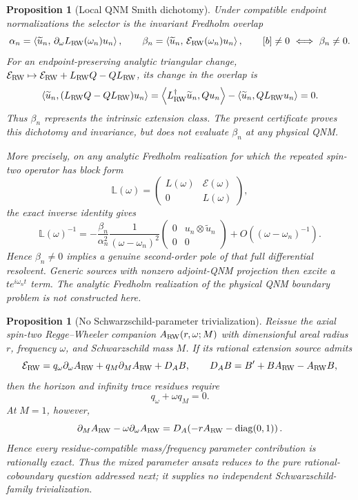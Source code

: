 \documentclass[11pt]{article}
\newtheorem{proposition}[theorem]{Proposition}
\theoremstyle{definition}
\theoremstyle{remark}
\begin{document}
\begin{proposition}[Local QNM Smith dichotomy]
Under compatible endpoint normalizations the selector is the invariant
Fredholm overlap
\[
 \alpha_n=\left\langle\widetilde u_n,\,
 \partial_\omega L_{\rm RW}(\omega_n)u_n\right\rangle,\qquad
 \beta_n=
 \left\langle\widetilde u_n,\,
 \mathcal E_{\rm RW}(\omega_n)u_n\right\rangle,
 \qquad
 [b]\ne0\ \Longleftrightarrow\ \beta_n\ne0 .
\]
For an endpoint-preserving analytic triangular change,
\(\mathcal E_{\rm RW}\mapsto
\mathcal E_{\rm RW}+L_{\rm RW}Q-QL_{\rm RW}\), its change in the overlap is
\[
 \left\langle\widetilde u_n,(L_{\rm RW}Q-QL_{\rm RW})u_n\right\rangle
 =
 \left\langle L_{\rm RW}^\dagger\widetilde u_n,Qu_n\right\rangle
 -\left\langle\widetilde u_n,QL_{\rm RW}u_n\right\rangle=0.
\]
Thus \(\beta_n\) represents the intrinsic extension class.  The present
certificate proves this dichotomy and invariance, but does not evaluate
\(\beta_n\) at any physical QNM.

More precisely, on any analytic Fredholm realization for which the repeated
spin-two operator has block form
\[
 \mathbb L(\omega)=
 \begin{pmatrix}L(\omega)&\mathcal E(\omega)\\0&L(\omega)\end{pmatrix},
\]
the exact inverse identity gives
\[
 \mathbb L(\omega)^{-1}
 =
 -\frac{\beta_n}{\alpha_n^2}
 \frac{1}{(\omega-\omega_n)^2}
 \begin{pmatrix}
 0&u_n\otimes\widetilde u_n\\0&0
 \end{pmatrix}
+O((\omega-\omega_n)^{-1}).
\]
Hence \(\beta_n\ne0\) implies a genuine second-order pole of that full
differential resolvent.  Generic sources with nonzero adjoint-QNM projection
then excite a \(t e^{i\omega_n t}\) term.  The analytic Fredholm realization
of the physical QNM boundary problem is not constructed here.
\end{proposition}

\begin{proposition}[No Schwarzschild-parameter trivialization]
\label{prop:axial-qnm-no-parameter-trivialization}
Reissue the axial spin-two Regge--Wheeler companion
\(A_{\rm RW}(r,\omega;M)\) with dimensionful areal radius \(r\), frequency
\(\omega\), and Schwarzschild mass \(M\).  If its rational extension source
admits
\[
 \mathcal E_{\rm RW}
 =q_\omega\partial_\omega A_{\rm RW}
 +q_M\partial_M A_{\rm RW}
 +D_AB,\qquad
 D_AB=B'+BA_{\rm RW}-A_{\rm RW}B,
\]
then the horizon and infinity trace residues require
\[
 q_\omega+\omega q_M=0.
\]
At \(M=1\), however,
\[
 \partial_MA_{\rm RW}-\omega\partial_\omega A_{\rm RW}
 =D_A\!\left(-rA_{\rm RW}-\operatorname{diag}(0,1)\right).
\]
Hence every residue-compatible mass/frequency parameter contribution is
rationally exact.  Thus the mixed parameter ansatz reduces to the pure
rational-coboundary question addressed next; it supplies no independent
Schwarzschild-family trivialization.
\end{proposition}
\end{document}
